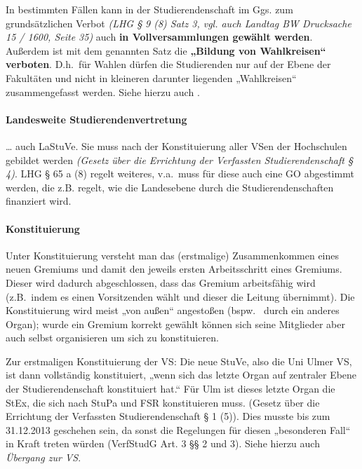 \documentclass[
10pt,
a4paper,
twoside,								%
titlepage=false,							%
draft=false								%
]{scrartcl}
\begin{document}
In bestimmten Fällen kann in der Studierendenschaft im Ggs. zum grundsätzlichen Verbot \textit{(LHG § 9 (8) Satz 3, vgl. auch Landtag BW Drucksache 15 / 1600, Seite 35)} auch \textbf{in Vollversammlungen gewählt werden}. Außerdem ist mit dem genannten Satz die \textbf{„Bildung von Wahlkreisen“ verboten}. D.h.~für Wahlen dürfen die Studierenden nur auf der Ebene der Fakultäten und nicht in kleineren darunter liegenden „Wahlkreisen“ zusammengefasst werden. Siehe hierzu auch .



\paragraph{Landesweite Studierendenvertretung}

… auch LaStuVe. Sie muss nach der Konstituierung aller VSen der Hochschulen gebildet werden \textit{(Gesetz über die Errichtung der Verfassten Studierendenschaft § 4)}. LHG § 65 a (8) regelt weiteres, v.a.~muss für diese auch eine GO abgestimmt werden, die z.B. regelt, wie die Landesebene durch die Studierendenschaften finanziert wird.



\paragraph{Konstituierung}

Unter Konstituierung versteht man das (erstmalige) Zusammenkommen eines neuen Gremiums und damit den jeweils ersten Arbeitsschritt eines Gremiums. Dieser wird dadurch abgeschlossen, dass das Gremium arbeitsfähig wird (z.B.~indem es einen Vorsitzenden wählt und dieser die Leitung übernimmt). Die Konstituierung wird meist „von außen“ angestoßen (bspw.~ durch ein anderes Organ); wurde ein Gremium korrekt gewählt können sich seine Mitglieder aber auch selbst organisieren um sich zu konstituieren.

Zur erstmaligen Konstituierung der VS: Die neue StuVe, also die Uni Ulmer VS, ist dann vollständig konstituiert, „wenn sich das letzte Organ auf zentraler Ebene der Studierendenschaft konstituiert hat.“ Für Ulm ist dieses letzte Organ die StEx, die sich nach StuPa und FSR konstituieren muss. (Gesetz über die Errichtung der Verfassten Studierendenschaft § 1 (5)). Dies musste bis zum 31.12.2013 geschehen sein, da sonst die Regelungen für diesen „besonderen Fall“ in Kraft treten würden (VerfStudG Art. 3 §§ 2 und 3). Siehe hierzu auch \emph{Übergang zur VS}.
\end{document}
